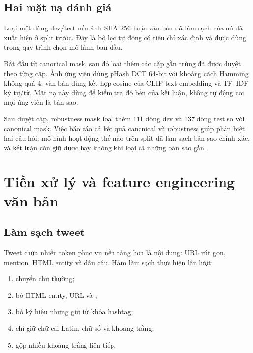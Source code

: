 \subsection{Hai mặt nạ đánh giá}

\begin{description}[leftmargin=3.8cm,style=nextline]
  \item[Canonical mask] Loại một dòng dev/test nếu ảnh SHA-256 hoặc văn bản đã
        làm sạch của nó đã xuất hiện ở split trước. Đây là bộ lọc tự động có
        tiêu chí xác định và được dùng trong quy trình chọn mô hình ban đầu.
  \item[Robustness mask] Bắt đầu từ canonical mask, sau đó loại thêm các cặp gần
        trùng đã được duyệt theo từng cặp. Ảnh ứng viên dùng pHash DCT 64-bit
        với khoảng cách Hamming không quá 4; văn bản dùng kết hợp cosine của
        CLIP text embedding và TF--IDF ký tự/từ. Mặt nạ này dùng để kiểm tra độ
        bền của kết luận, không tự động coi mọi ứng viên là bản sao.
\end{description}

Sau duyệt cặp, robustness mask loại thêm 111 dòng dev và 137 dòng test so với
canonical mask. Việc báo cáo cả kết quả canonical và robustness giúp phân biệt
hai câu hỏi: mô hình hoạt động thế nào trên split đã làm sạch bản sao chính xác,
và kết luận còn giữ được hay không khi loại cả những bản sao gần.

\section{Tiền xử lý và feature engineering văn bản}

\subsection{Làm sạch tweet}

Tweet chứa nhiều token phục vụ nền tảng hơn là nội dung: URL rút gọn, mention,
HTML entity và dấu câu. Hàm làm sạch thực hiện lần lượt:

\begin{enumerate}[leftmargin=*]
  \item chuyển chữ thường;
  \item bỏ HTML entity, URL và ;
  \item bỏ ký hiệu \code{\#} nhưng giữ từ khóa hashtag;
  \item chỉ giữ chữ cái Latin, chữ số và khoảng trắng;
  \item gộp nhiều khoảng trắng liên tiếp.
\end{enumerate}

